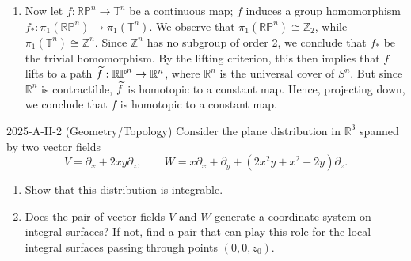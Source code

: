 \documentclass{article}
\begin{document}
\begin{solutions}
\begin{enumerate}[itemsep =-2pt,label = (\roman{*})]
		Now we recall that if $p: E \to B$ is a covering map, $b_{0} \in B$, $e_{0} \in p^{-1}(b_{0})$, and $E$ is simply connected, then the map $\phi: \pi_{1}(B, b_{0}) \to p^{-1}(b_{0})$ defined by $\phi([f]) = \ti{f}(1)$, where $\ti{f}$ is a lift of $f$ to a path in $E$ beginning at $e_{0}$, is bijective. Since $p^{-1}(b_{0})$ contains only two elements for every $b_{0} \in \mathbb{RP}^{n}$ and $S^{n}$ is simply connected, $\pi_{1}(\mathbb{RP}^{n}, b_{0})$ is a group of two elements. Therefore, the fundamental group of $\mathbb{RP}^{n}$ is simply $\mathbb{Z}_{2}$. 
		\item Now let $f: \mathbb{RP}^{n} \to \mathbb{T}^{n}$ be a continuous map; $f$ induces a group homomorphism $f_{\ast}: \pi_{1}(\mathbb{RP}^{n}) \longrightarrow \pi_{1}(\mathbb{T}^{n})$. We observe that $\pi_{1}(\mathbb{RP}^{n}) \cong \mathbb{Z}_{2}$, while $\pi_{1}(\mathbb{T}^{n}) \cong \mathbb{Z}^{n}$. Since $\mathbb{Z}^{n}$ has no subgroup of order 2, we conclude that $f_{\ast}$ be the trivial homomorphism. By the lifting criterion, this then implies that $f$ lifts to a path $\widetilde{f}: \mathbb{RP}^{n} \to \mathbb{R}^{n}$, where $\mathbb{R}^{n}$ is the universal cover of $S^{n}$. But since $\mathbb{R}^{n}$ is contractible, $\ti{f}$ is homotopic to a constant map. Hence, projecting down, we conclude that $f$ is homotopic to a constant map. 
	\end{enumerate}
\end{solutions}
\begin{prb}{2025-A-II-2 (Geometry/Topology)}
	Consider the plane distribution in $\mathbb{R}^{3}$ spanned by two vector fields 
	\begin{equation}
		V = \partial_{x} + 2xy\partial_{z}, \qquad W = x\partial_{x} + \partial_{y} + (2x^{2}y + x^{2} - 2y)\partial_{z}. 
	\end{equation}
	\begin{enumerate}[itemsep =-2pt,label = (\roman{*})]
		\item Show that this distribution is integrable. 
		\item Does the pair of vector fields $V$ and $W$ generate a coordinate system on integral surfaces? If not, find a pair that can play this role for the local integral surfaces passing through points $(0,0,z_{0})$. 
	\end{enumerate}
\end{prb}
\end{document}
